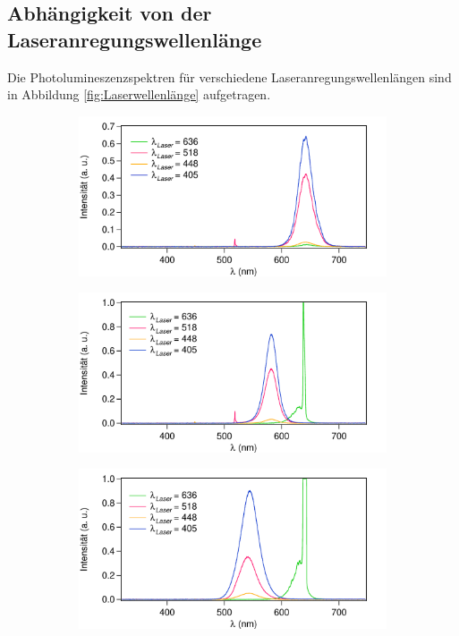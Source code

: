 \subsection{Abhängigkeit von der Laseranregungswellenlänge}
Die Photolumineszenzspektren für verschiedene Laseranregungswellenlängen sind in Abbildung \ref{fig:Laserwellenlänge} aufgetragen.
\begin{figure}[H]
    \centering
    \begin{subfigure}{0.49\textwidth}
        \includegraphics[width=\textwidth]{bilder/Nr1_Laser.pdf}
        \caption{}
        \label{fig:A1}
    \end{subfigure}
    \begin{subfigure}{0.49\textwidth}
        \includegraphics[width=\textwidth]{bilder/Nr2_Laser.pdf}
        \caption{}
        \label{fig:A2}
    \end{subfigure}
    \begin{subfigure}{0.49\textwidth}
        \includegraphics[width=\textwidth]{bilder/Nr3_Laser.pdf}

\end{subfigure}
\end{figure}
